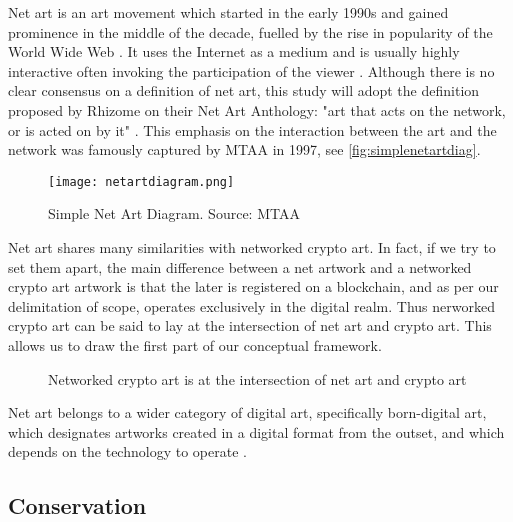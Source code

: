 Net art is an art movement which started in the early 1990s and gained prominence in the middle of the decade, fuelled by the rise in popularity of the World Wide Web \cite{schreiberNetArtShedding2001}. It uses the Internet as a medium and is usually highly interactive often invoking the participation of the viewer \cite{kholeifInternet_ArtBirthWeb2023}. Although there is no clear consensus on a definition of net art, this study will adopt the definition proposed by Rhizome on their Net Art Anthology: "art that acts on the network, or is acted on by it" \cite{WhatNetArt2017}.
This emphasis on the interaction between the art and the network was famously captured by MTAA in 1997, see \autoref{fig:simplenetartdiag}.

\begin{figure}[h]
    \centering
    \captionsetup{justification=centering}
    \texttt{[image: netartdiagram.png]}
    \caption[Simple Net Art Diagram]{Simple Net Art Diagram. Source: MTAA \cite{NETARTANTHOLOGY2016a}}
    \label{fig:simplenetartdiag}
\end{figure}

Net art shares many similarities with networked crypto art. In fact, if we try to set them apart, the main difference between a net artwork and a networked crypto art artwork is that the later is registered on a blockchain, and as per our delimitation of scope, operates exclusively in the digital realm. Thus nerworked crypto art can be said to lay at the intersection of net art and crypto art. This allows us to draw the first part of our conceptual framework.


\begin{figure}[h]
    \centering
    \captionsetup{justification=centering}
    
    \caption[Networked crypto art vs net art vs crypto art]{Networked crypto art is at the intersection of net art and crypto art}
    \label{fig:netart-crypto-art}
\end{figure}

Net art belongs to a wider category of digital art, specifically born-digital art, which designates artworks created in a digital format from the outset, and which depends on the technology to operate \cite{innocentiKeepingBitsAlive2013}.

\subsection{Conservation}

